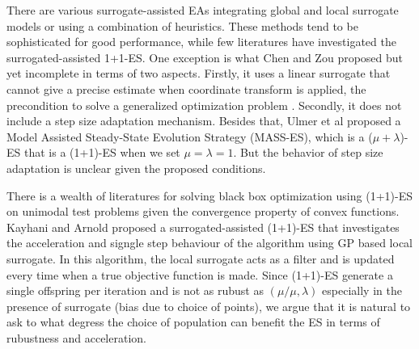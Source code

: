 There are various surrogate-assisted EAs integrating global and local surrogate models or using a combination of heuristics. These methods tend to be sophisticated for good performance, while few literatures have investigated the surrogated-assisted 1+1-ES. One exception is what Chen and Zou \cite{10.1007/978-3-319-09333-8_4} proposed but yet incomplete in terms of two aspects. Firstly, it uses a linear surrogate that cannot give a precise estimate when coordinate transform is applied, the precondition to solve a generalized optimization problem \cite{DBLP:conf/ppsn/KayhaniA18}. Secondly, it does not include a step size adaptation mechanism. Besides that, Ulmer et al \cite{Ulmer2005} proposed a Model Assisted Steady-State Evolution Strategy (MASS-ES), which is a ($\mu+\lambda$)-ES that is a (1+1)-ES when we set $\mu=\lambda=1$. But the behavior of step size adaptation is unclear given the proposed conditions.






There is a wealth of literatures for solving black box optimization using (1+1)-ES on unimodal test problems given the convergence property of convex functions. Kayhani and Arnold \cite{DBLP:conf/ppsn/KayhaniA18} proposed a surrogated-assisted (1+1)-ES that investigates the acceleration and signgle step behaviour of the algorithm using GP based local surrogate. In this algorithm, the local surrogate acts as a filter and is updated every time when a true objective function is made. Since (1+1)-ES generate a single offspring per iteration and is not as rubust as $(\mu/\mu,\lambda)$ especially in the presence of surrogate (bias due to choice of points), we argue that it is natural to ask to what degress the choice of population can benefit the ES in terms of rubustness and acceleration.

 
